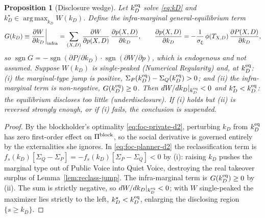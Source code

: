 \documentclass[11pt]{article}
\newtheorem{proposition}{Proposition}
\newcommand{\1}{\mathbf{1}}
\begin{document}
\begin{proposition}[Disclosure wedge]
\label{prop:disclosure-wedge}
Let $k_D^{\textup{eq}}$ solve \eqref{eq:kD} and
$k_D^{\star}\in\operatorname*{arg\,max}_{k_D}W(k_D)$. Define the infra-marginal
general-equilibrium term
\begin{equation}
G(k_D)\equiv\frac{\partial W}{\partial k_D}\bigg|_{\textup{infra}}
 =\sum_{(X,D)}\frac{\partial W}{\partial p(X,D)}\,
   \frac{\partial p(X,D)}{\partial k_D},\qquad
\frac{\partial p(X,D)}{\partial k_D}
 =-\frac{1}{\sigma_\xi}\,\phi(T_{X,D})\,\frac{\partial P(X,D)}{\partial k_D},
\label{eq:G-term}
\end{equation}
so $\operatorname{sgn}G=-\operatorname{sgn}(\partial P/\partial k_D)\cdot
\operatorname{sgn}(\partial W/\partial p)$, which is endogenous and not assumed.
Suppose $W(k_D)$ is single-peaked \emph{(Numerical Regularity)} and, at
$k_D^{\textup{eq}}$:
\textup{(i)} the marginal-type jump is positive,
$\Sigma_P(k_D^{\textup{eq}})-\Sigma_Q(k_D^{\textup{eq}})>0$; and
\textup{(ii)} the infra-marginal term is non-negative,
$G(k_D^{\textup{eq}})\ge0$.
Then $dW/dk_D|_{k_D^{\textup{eq}}}<0$ and $k_D^{\star}<k_D^{\textup{eq}}$: the
equilibrium discloses too little (underdisclosure). If (i) holds but (ii) is
reversed strongly enough, or if (i) fails, the conclusion is suspended.
\end{proposition}

\begin{proof}
By the blockholder's optimality \eqref{eq:foc-private-d2}, perturbing $k_D$ from
$k_D^{\textup{eq}}$ has zero first-order effect on $\Pi^{\textup{block}}$, so the
social derivative is governed entirely by the externalities she ignores. In
\eqref{eq:foc-planner-d2} the reclassification term is
$f_s(k_D)[\Sigma_Q-\Sigma_P]=-f_s(k_D)[\Sigma_P-\Sigma_Q]<0$ by (i): raising
$k_D$ pushes the marginal type out of Public Voice into Quiet Voice, destroying
the real takeover surplus of Lemma~\ref{lem:reclass-jump}. The infra-marginal term
is $G(k_D^{\textup{eq}})\ge0$ by (ii). The sum is strictly negative, so
$dW/dk_D|_{k_D^{\textup{eq}}}<0$; with $W$ single-peaked the maximizer lies
strictly to the left, $k_D^{\star}<k_D^{\textup{eq}}$, enlarging the disclosing
region $\{s\ge k_D\}$.
\end{proof}
\end{document}
